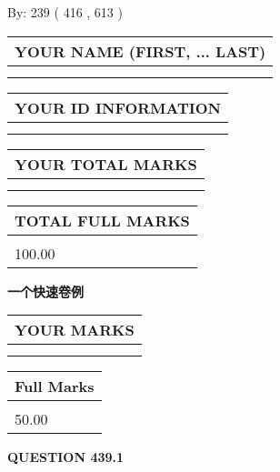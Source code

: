\documentclass{ctexart}
\begin{document}
   
\hspace{1.0in} By: 
 239 ( 416 ,  613 )
   
   
   
   
\newpage 
\setcounter{page}{ 
   439001 } 
   
   
   
   
\noindent\begin{tabular}{|l|}
\hline
YOUR NAME (FIRST, ... LAST)  \\
\hline
 \\ 
 \\ 
\hline
\end{tabular}
\hspace{0.05in} \begin{tabular}{|l|}
\hline
 YOUR   ID   INFORMATION  \\
\hline
 \\ 
 \\ 
\hline
\end{tabular}
   
   
\vspace{0.2in}\noindent\begin{tabular}{|l|}
\hline
YOUR TOTAL MARKS  \\
\hline
 \\ 
 \\ 
\hline
\end{tabular}
\hspace{0.05in} \begin{tabular}{|l|}
\hline
TOTAL FULL MARKS  \\
\hline
 \\ 
100.00 \\
\hline
\end{tabular}
   
   
 \vspace{0.2in}
{\LARGE {\textbf{ 一个快速卷例}}}
   
   
  
\vspace{0.2in}
  
\noindent\begin{tabular}{|l|}
\hline
 YOUR MARKS  \\
\hline
 \\ 
 \\ 
\hline
\end{tabular}
\hspace{0.05in} \begin{tabular}{|l|}
\hline
 Full Marks  \\
\hline
 \\ 
50.00 \\
\hline
\end{tabular}
{\textbf{\Large{QUESTION
439.1 
}}}
  
\end{document}
